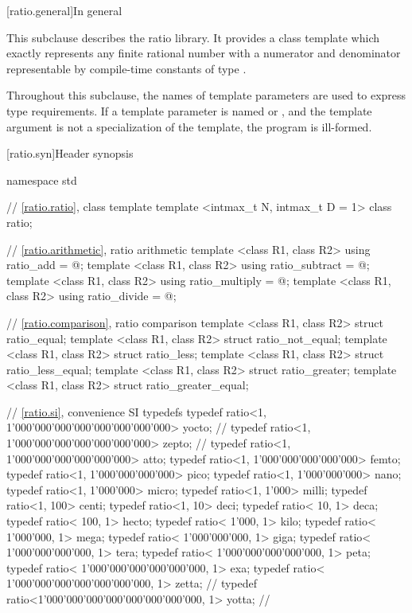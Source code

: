 [ratio.general]{In general}

\pnum
{}%
This subclause describes the ratio library. It provides a class template
 which exactly represents any finite rational number with a
numerator and denominator representable by compile-time constants of type
.

\pnum
Throughout this subclause, the names of template parameters are used to express
type requirements. If a template parameter is named  or ,
and the template argument is not a specialization of the  template,
the program is ill-formed.

[ratio.syn]{Header  synopsis}

\begin{codeblockdigitsep}
namespace std {
  // \ref{ratio.ratio}, class template 
  template <intmax_t N, intmax_t D = 1> class ratio;

  // \ref{ratio.arithmetic}, ratio arithmetic
  template <class R1, class R2> using ratio_add = @\seebelow@;
  template <class R1, class R2> using ratio_subtract = @\seebelow@;
  template <class R1, class R2> using ratio_multiply = @\seebelow@;
  template <class R1, class R2> using ratio_divide = @\seebelow@;

  // \ref{ratio.comparison}, ratio comparison
  template <class R1, class R2> struct ratio_equal;
  template <class R1, class R2> struct ratio_not_equal;
  template <class R1, class R2> struct ratio_less;
  template <class R1, class R2> struct ratio_less_equal;
  template <class R1, class R2> struct ratio_greater;
  template <class R1, class R2> struct ratio_greater_equal;

  // \ref{ratio.si}, convenience SI typedefs
  typedef ratio<1, 1'000'000'000'000'000'000'000'000> yocto;  // \seebelow
  typedef ratio<1,     1'000'000'000'000'000'000'000> zepto;  // \seebelow
  typedef ratio<1,         1'000'000'000'000'000'000> atto;
  typedef ratio<1,             1'000'000'000'000'000> femto;
  typedef ratio<1,                 1'000'000'000'000> pico;
  typedef ratio<1,                     1'000'000'000> nano;
  typedef ratio<1,                         1'000'000> micro;
  typedef ratio<1,                             1'000> milli;
  typedef ratio<1,                               100> centi;
  typedef ratio<1,                                10> deci;
  typedef ratio<                               10, 1> deca;
  typedef ratio<                              100, 1> hecto;
  typedef ratio<                            1'000, 1> kilo;
  typedef ratio<                        1'000'000, 1> mega;
  typedef ratio<                    1'000'000'000, 1> giga;
  typedef ratio<                1'000'000'000'000, 1> tera;
  typedef ratio<            1'000'000'000'000'000, 1> peta;
  typedef ratio<        1'000'000'000'000'000'000, 1> exa;
  typedef ratio<    1'000'000'000'000'000'000'000, 1> zetta;  // \seebelow
  typedef ratio<1'000'000'000'000'000'000'000'000, 1> yotta;  // \seebelow
}
\end{codeblockdigitsep}

